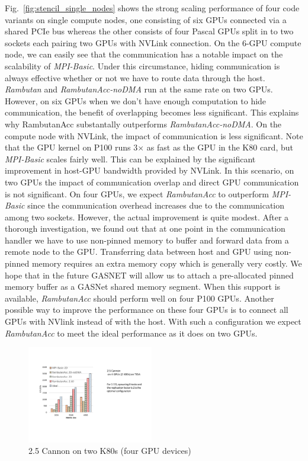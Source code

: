 Fig.~\ref{fig:stencil_single_nodes} shows the strong scaling performance of four code variants on single compute nodes, one consisting of six GPUs connected via a shared PCIe bus whereas the other consists of four Pascal GPUs split in to two sockets each pairing two GPUs with NVLink connection. 
On the 6-GPU compute node, we can easily see that the communication has a notable impact on the scalability of {\em MPI-Basic}.
Under this circumstance, hiding communication is always effective whether or not we have to route data through the host.
{\em Rambutan} and {\em RambutanAcc-noDMA} run at the same rate on two GPUs.
However, on six GPUs when we don't have enough computation to hide communication, the benefit of overlapping becomes less significant.
This explains why RambutanAcc substantally outperforms {\em RambutanAcc-noDMA}.
On the compute node with NVLink, the impact of communication is less significant.
Note that the GPU kernel on P100 runs 3$\times$ as fast as the GPU in the K80 card, but {\em MPI-Basic} scales fairly well.
This can be explained by the significant improvement in host-GPU bandwidth provided by NVLink.
In this scenario, on two GPUs the impact of communication overlap and direct GPU communication is not significant.
On four GPUs, we expect {\em RambutanAcc} to outperform {\em MPI-Basic} since the communication overhead increases due to the communication among two sockets.
However, the actual improvement is quite modest.
After a thorough investigation, we found out that at one point in the communication handler we have to use non-pinned memory to buffer and forward data from a remote node to the GPU.
Transferring data between host and GPU using non-pinned memory requires an extra memory copy which is generally very costly.
We hope that in the future GASNET will allow us to attach a pre-allocated pinned memory buffer as a GASNet shared memory segment.
When this support is available, {\em RambutanAcc} should perform well on four P100 GPUs.
Another possible way to improve the performance on these four GPUs is to connect all GPUs with NVlink instead of with the host.
With such a configuration we expect {\em RambutanAcc} to meet the ideal performance as it does on two GPUs.




\begin{figure}[htb]
\centering
\includegraphics[width=0.49\textwidth]{figures/cannon_tida.pdf}
\caption{2.5 Cannon on two K80s (four GPU devices)}
\label{cannon_onnode}
\end{figure}



